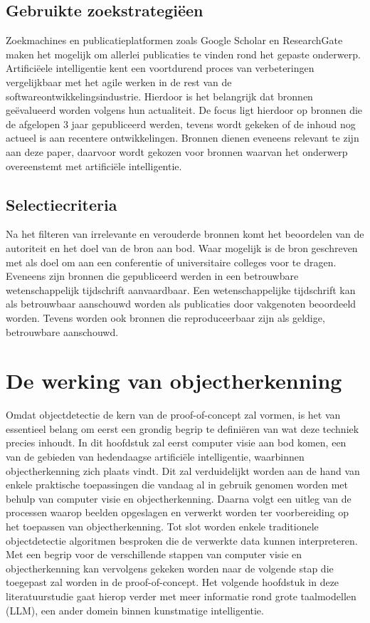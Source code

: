 \subsection{Gebruikte zoekstrategiëen}
\label{subsec:zoekstrategieen}
Zoekmachines en publicatieplatformen zoals Google Scholar en ResearchGate maken het mogelijk om allerlei publicaties te vinden rond het gepaste onderwerp.
Artifici\"eele intelligentie kent een voortdurend proces van verbeteringen vergelijkbaar met het agile werken in de rest van de softwareontwikkelingsindustrie.
Hierdoor is het belangrijk dat bronnen ge\"evalueerd worden volgens hun actualiteit.
De focus ligt hierdoor op bronnen die de afgelopen 3 jaar gepubliceerd werden, tevens wordt gekeken of de inhoud nog actueel is aan recentere ontwikkelingen.
Bronnen dienen eveneens relevant te zijn aan deze paper, daarvoor wordt gekozen voor bronnen waarvan het onderwerp overeenstemt met artifici\"ele intelligentie.

\subsection{Selectiecriteria}
\label{subsec:selectiecriteria}
Na het filteren van irrelevante en verouderde bronnen komt het beoordelen van de autoriteit en het doel van de bron aan bod.
Waar mogelijk is de bron geschreven met als doel om aan een conferentie of universitaire colleges voor te dragen.
Eveneens zijn bronnen die gepubliceerd werden in een betrouwbare wetenschappelijk tijdschrift aanvaardbaar.
Een wetenschappelijke tijdschrift kan als betrouwbaar aanschouwd worden als publicaties door vakgenoten beoordeeld worden.
Tevens worden ook bronnen die reproduceerbaar zijn als geldige, betrouwbare aanschouwd.

\section{De werking van objectherkenning}\label{sec:ls-object-detectie}
Omdat objectdetectie de kern van de proof-of-concept zal vormen, is het van essentieel belang om eerst een grondig begrip te defini\"eren van wat deze techniek precies inhoudt.
In dit hoofdstuk zal eerst computer visie aan bod komen, een van de gebieden van hedendaagse artifici\"ele intelligentie, waarbinnen objectherkenning zich plaats vindt.
Dit zal verduidelijkt worden aan de hand van enkele praktische toepassingen die vandaag al in gebruik genomen worden met behulp van computer visie en objectherkenning.
Daarna volgt een uitleg van de processen waarop beelden opgeslagen en verwerkt worden ter voorbereiding op het toepassen van objectherkenning.
Tot slot worden enkele traditionele objectdetectie algoritmen besproken die de verwerkte data kunnen interpreteren.
Met een begrip voor de verschillende stappen van computer visie en objectherkenning kan vervolgens gekeken worden naar de volgende stap die toegepast zal worden in de proof-of-concept.
Het volgende hoofdstuk in deze literatuurstudie gaat hierop verder met meer informatie rond grote taalmodellen (LLM), een ander domein binnen kunstmatige intelligentie.

